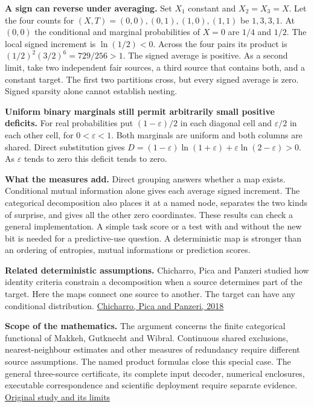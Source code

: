 \textbf{A sign can reverse under averaging.} Set \(X_1\) constant and \(X_2=X_3=X\). Let the four counts for \((X,T)=(0,0),(0,1),(1,0),(1,1)\) be \(1,3,3,1\). At \((0,0)\) the conditional and marginal probabilities of \(X=0\) are \(1/4\) and \(1/2\). The local signed increment is \(\ln(1/2)<0\). Across the four pairs its product is \((1/2)^2(3/2)^6=729/256>1\). The signed average is positive. As a second limit, take two independent fair sources, a third source that contains both, and a constant target. The first two partitions cross, but every signed average is zero. Signed sparsity alone cannot establish nesting.

\textbf{Uniform binary marginals still permit arbitrarily small positive deficits.} For real probabilities put \((1-\varepsilon)/2\) in each diagonal cell and \(\varepsilon/2\) in each other cell, for \(0<\varepsilon<1\). Both marginals are uniform and both columns are shared. Direct substitution gives \(D=(1-\varepsilon)\ln(1+\varepsilon)+\varepsilon\ln(2-\varepsilon)>0\). As \(\varepsilon\) tends to zero this deficit tends to zero.

\textbf{What the measures add.} Direct grouping answers whether a map exists. Conditional mutual information alone gives each average signed increment. The categorical decomposition also places it at a named node, separates the two kinds of surprise, and gives all the other zero coordinates. These results can check a general implementation. A simple task score or a test with and without the new bit is needed for a predictive-use question. A deterministic map is stronger than an ordering of entropies, mutual informations or prediction scores.

\textbf{Related deterministic assumptions.} Chicharro, Pica and Panzeri studied how identity criteria constrain a decomposition when a source determines part of the target. Here the maps connect one source to another. The target can have any conditional distribution. \href{https://doi.org/10.3390/e20030169}{Chicharro, Pica and Panzeri, 2018}

\textbf{Scope of the mathematics.} The argument concerns the finite categorical functional of Makkeh, Gutknecht and Wibral. Continuous shared exclusions, nearest-neighbour estimates and other measures of redundancy require different source assumptions. The named product formulas close this special case. The general three-source certificate, its complete input decoder, numerical enclosures, executable correspondence and scientific deployment require separate evidence. \href{https://github.com/sepahead/pid-rs/blob/main/audit/research/three-source-six-certificate-observations/README.md}{Original study and its limits}

